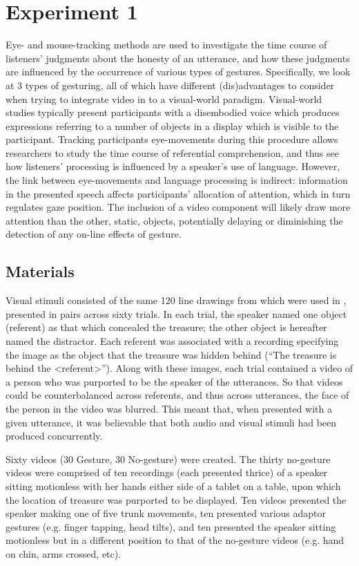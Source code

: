 \documentclass[a4paper,man,natbib]{apa6}
\begin{document}
\section{Experiment 1}
Eye- and mouse-tracking methods are used to investigate the time course of listeners' judgments about the honesty of an utterance, and how these judgments are influenced by the occurrence of various types of gestures. 
Specifically, we look at 3 types of gesturing, all of which have different (dis)advantages to consider when trying to integrate video in to a visual-world paradigm.
Visual-world studies typically present participants with a disembodied voice which produces expressions referring to a number of objects in a display which is visible to the participant.
Tracking participants eye-movements during this procedure allows researchers to study the time course of referential comprehension, and thus see how listeners' processing is influenced by a speaker's use of language.
However, the link between eye-movements and language processing is indirect: information in the presented speech affects participants' allocation of attention, which in turn regulates gaze position. 
The inclusion of a video component will likely draw more attention than the other, static, objects, potentially delaying or diminishing the detection of any on-line effects of gesture.

\subsection{Materials}
Visual stimuli consisted of the same 120 line drawings from \citet{Snodgrass1980} which were used in \citet{Loy2017}, presented in pairs across sixty trials. 
In each trial, the speaker named one object (referent) as that which concealed the treasure; the other object is hereafter named the distractor.
Each referent was associated with a recording specifying the image as the object that the treasure was hidden behind (``The treasure is behind the <referent>'').
Along with these images, each trial contained a video of a person who was purported to be the speaker of the utterances. 
So that videos could be counterbalanced across referents, and thus across utterances, the face of the person in the video was blurred. 
This meant that, when presented with a given utterance, it was believable that both audio and visual stimuli had been produced concurrently. 

Sixty videos (30 Gesture, 30 No-gesture) were created. 
The thirty no-gesture videos were comprised of ten recordings (each presented thrice) of a speaker sitting motionless with her hands either side of a tablet on a table, upon which the location of treasure was purported to be displayed.
Ten videos presented the speaker making one of five trunk movements, ten presented various adaptor gestures (e.g. finger tapping, head tilts), and ten presented the speaker sitting motionless but in a different position to that of the no-gesture videos (e.g. hand on chin, arms crossed, etc).
\end{document}
